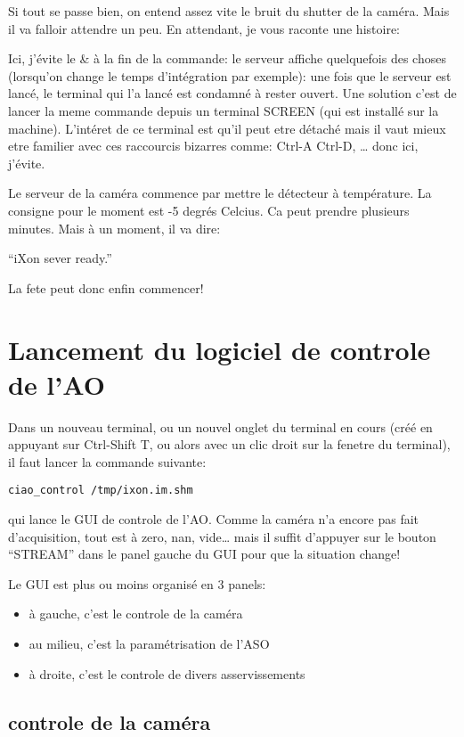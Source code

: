 \documentclass[11pt]{article}
\begin{document}
Si tout se passe bien, on entend assez vite le bruit du shutter de la
caméra. Mais il va falloir attendre un peu. En attendant, je vous
raconte une histoire:

Ici, j'évite le \& à la fin de la commande: le serveur affiche
quelquefois des choses (lorsqu'on change le temps d'intégration par
exemple): une fois que le serveur est lancé, le terminal qui l'a
lancé est condamné à rester ouvert. Une solution c'est de lancer la
meme commande depuis un terminal SCREEN (qui est installé sur la
machine). L'intéret de ce terminal est qu'il peut etre détaché mais
il vaut mieux etre familier avec ces raccourcis bizarres comme: Ctrl-A
Ctrl-D, \ldots{} donc ici, j'évite.

Le serveur de la caméra commence par mettre le détecteur à
température. La consigne pour le moment est -5 degrés Celcius. Ca
peut prendre plusieurs minutes. Mais à un moment, il va dire:

``iXon sever ready.''

La fete peut donc enfin commencer!
\section{Lancement du logiciel de controle de l'AO}
\label{sec-3}


Dans un nouveau terminal, ou un nouvel onglet du terminal en cours
(créé en appuyant sur Ctrl-Shift T, ou alors avec un clic droit sur la
fenetre du terminal), il faut lancer la commande suivante:


\begin{verbatim}
ciao_control /tmp/ixon.im.shm
\end{verbatim}

qui lance le GUI de controle de l'AO. Comme la caméra n'a encore pas
fait d'acquisition, tout est à zero, nan, vide\ldots{} mais il suffit
d'appuyer sur le bouton ``STREAM'' dans le panel gauche du GUI pour que
la situation change!

Le GUI est plus ou moins organisé en 3 panels:

\begin{itemize}
\item à gauche, c'est le controle de la caméra
\item au milieu, c'est la paramétrisation de l'ASO
\item à droite, c'est le controle de divers asservissements
\end{itemize}
\subsection{controle de la caméra}
\label{sec-3-1}
\end{document}
